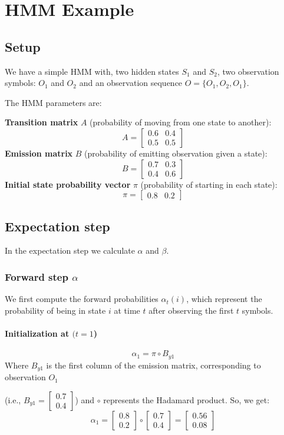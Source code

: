 \section{HMM Example}
\subsection{Setup}
We have a simple HMM with, two hidden states \( S_1 \) and \( S_2 \), two observation symbols: \( O_1 \) and \( O_2 \) and an observation sequence \( O = \{ O_1, O_2, O_1 \} \).

The HMM parameters are:

\textbf{Transition matrix} \( A \) (probability of moving from one state to another):
  \[
  A = \begin{bmatrix}
  0.6 & 0.4 \\
  0.5 & 0.5
  \end{bmatrix}
  \]
\textbf{Emission matrix} \( B \) (probability of emitting observation given a state):
  \[
  B = \begin{bmatrix}
  0.7 & 0.3 \\
  0.4 & 0.6
  \end{bmatrix}
  \]
\textbf{Initial state probability vector} \( \pi \) (probability of starting in each state):
  \[
  \pi = \begin{bmatrix} 0.8 & 0.2 \end{bmatrix}
  \]
\subsection{Expectation step}
In the expectation step we calculate $\alpha$ and $\beta$.
\subsubsection{Forward step $\alpha$}

We first compute the forward probabilities \( \alpha_t(i) \), which represent the probability of being in state \( i \) at time \( t \) after observing the first \( t \) symbols.

\paragraph{Initialization at \( (t = 1 \))}
  \[
  \alpha_1 = \pi \circ B_{y1}
  \]
  Where \( B_{y1} \) is the first column of the emission matrix, corresponding to observation \( O_1 \) 
  
  (i.e., \( B_{y1} = \begin{bmatrix} 0.7 \\ 0.4 \end{bmatrix} \)) and \( \circ \) represents the Hadamard product. So, we get:
  \[
  \alpha_1 = \begin{bmatrix} 0.8 \\ 0.2 \end{bmatrix} \circ \begin{bmatrix} 0.7 \\ 0.4 \end{bmatrix} = \begin{bmatrix} 0.56 \\ 0.08 \end{bmatrix}
  \]


